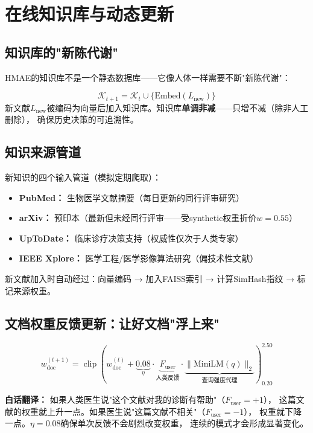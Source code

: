 \documentclass[11pt,a4paper]{ctexart}
\DeclareMathOperator{\clip}{clip}
\begin{document}
\section{在线知识库与动态更新}

\subsection{知识库的"新陈代谢"}

HMAE的知识库不是一个静态数据库——它像人体一样需要不断"新陈代谢"：

\begin{defbox}
$$\mathcal{K}_{t+1} = \mathcal{K}_t \cup \{\text{Embed}(L_{\text{new}})\}$$
新文献$L_{\text{new}}$被编码为向量后加入知识库。知识库\textbf{单调非减}——只增不减（除非人工删除），
确保历史决策的可追溯性。
\end{defbox}

\subsection{知识来源管道}

新知识的四个输入管道（模拟定期爬取）：
\begin{itemize}[nosep]
\item \textbf{PubMed：} 生物医学文献摘要（每日更新的同行评审研究）
\item \textbf{arXiv：} 预印本（最新但未经同行评审——受synthetic权重折价$w=0.55$）
\item \textbf{UpToDate：} 临床诊疗决策支持（权威性仅次于人类专家）
\item \textbf{IEEE Xplore：} 医学工程/医学影像算法研究（偏技术性文献）
\end{itemize}

新文献加入时自动经过：向量编码 → 加入FAISS索引 → 计算SimHash指纹 → 标记来源权重。

\subsection{文档权重反馈更新：让好文档"浮上来"}

$$w_{\text{doc}}^{(t+1)} = \clip\left(w_{\text{doc}}^{(t)} + \underbrace{0.08}_{\eta} \cdot \underbrace{F_{\text{user}}}_{\text{人类反馈}} \cdot \underbrace{\|\text{MiniLM}(q)\|_2}_{\text{查询强度代理}}\right)_{0.20}^{2.50}$$

\textbf{白话翻译：} 如果人类医生说"这个文献对我的诊断有帮助"（$F_{\text{user}}=+1$），
这篇文献的权重就上升一点。如果医生说"这篇文献不相关"（$F_{\text{user}}=-1$），
权重就下降一点。$\eta=0.08$确保单次反馈不会剧烈改变权重，
连续的模式才会形成显著变化。
\end{document}
